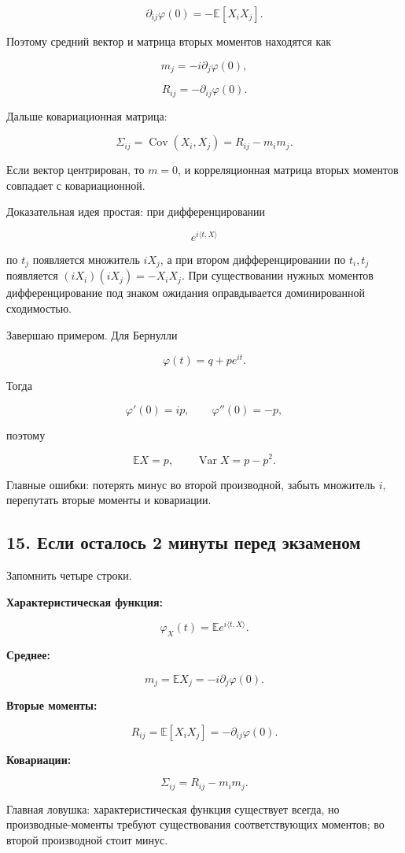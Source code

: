 \documentclass[
  11pt,
  a4paper,
]{article}
\begin{document}
\[
\partial_{ij}\varphi(0)=-\mathbb E[X_iX_j].
\]

Поэтому средний вектор и матрица вторых моментов находятся как

\[
m_j=-i\partial_j\varphi(0),
\]

\[
R_{ij}=-\partial_{ij}\varphi(0).
\]

Дальше ковариационная матрица:

\[
\Sigma_{ij}
=
\operatorname{Cov}(X_i,X_j)
=
R_{ij}-m_im_j.
\]

Если вектор центрирован, то \(m=0\), и корреляционная матрица вторых
моментов совпадает с ковариационной.

Доказательная идея простая: при дифференцировании

\[
e^{i\langle t,X\rangle}
\]

по \(t_j\) появляется множитель \(iX_j\), а при втором дифференцировании
по \(t_i,t_j\) появляется \((iX_i)(iX_j)=-X_iX_j\). При существовании
нужных моментов дифференцирование под знаком ожидания оправдывается
доминированной сходимостью.

Завершаю примером. Для Бернулли

\[
\varphi(t)=q+pe^{it}.
\]

Тогда

\[
\varphi'(0)=ip,
\qquad
\varphi''(0)=-p,
\]

поэтому

\[
\mathbb EX=p,
\qquad
\operatorname{Var}X=p-p^2.
\]

Главные ошибки: потерять минус во второй производной, забыть множитель
\(i\), перепутать вторые моменты и ковариации.

\subsection{15. Если осталось 2 минуты перед
экзаменом}\label{ux435ux441ux43bux438-ux43eux441ux442ux430ux43bux43eux441ux44c-2-ux43cux438ux43dux443ux442ux44b-ux43fux435ux440ux435ux434-ux44dux43aux437ux430ux43cux435ux43dux43eux43c}

Запомнить четыре строки.

\textbf{Характеристическая функция:}

\[
\varphi_X(t)=\mathbb E e^{i\langle t,X\rangle}.
\]

\textbf{Среднее:}

\[
m_j=\mathbb EX_j=-i\partial_j\varphi(0).
\]

\textbf{Вторые моменты:}

\[
R_{ij}=\mathbb E[X_iX_j]=-\partial_{ij}\varphi(0).
\]

\textbf{Ковариации:}

\[
\Sigma_{ij}=R_{ij}-m_im_j.
\]

Главная ловушка: характеристическая функция существует всегда, но
производные-моменты требуют существования соответствующих моментов; во
второй производной стоит минус.

\newpage
\end{document}
